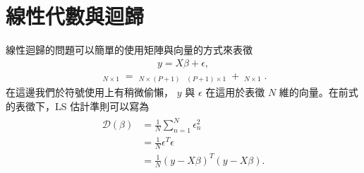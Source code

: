 \documentclass[letterpaper,10pt,english]{sphinxmanual}
\begin{document}
\section{線性代數與迴歸}
\label{\detokenize{notebook/linear-regression:id5}}
線性迴歸的問題可以簡單的使用矩陣與向量的方式來表徵
\begin{equation*}
\begin{split}y = X \beta + \epsilon,\end{split}
\end{equation*}\begin{equation*}
\begin{split}\mathop{\begin{pmatrix}
  y_{1} \\
  y_{2} \\
  \vdots \\
  y_{N}
 \end{pmatrix}}_{N \times 1}=
\mathop{\begin{pmatrix}
  1 & x_{11} & \cdots & x_{1P} \\
  1 & x_{21} & \cdots & x_{2P} \\
  \vdots  & \vdots  & \ddots & \vdots  \\
  1 & x_{N1} & \cdots & x_{NP}
 \end{pmatrix}}_{N \times (P+1)}
\mathop{\begin{pmatrix}
  \beta_{0} \\
  \beta_{1} \\
  \vdots \\
  \beta_{P}
 \end{pmatrix}}_{(P+1) \times 1}+
 \mathop{\begin{pmatrix}
  \epsilon_{1} \\
  \epsilon_{2} \\
  \vdots \\
  \epsilon_{N}
 \end{pmatrix}}_{N \times 1}.\end{split}
\end{equation*}
在這邊我們於符號使用上有稍微偷懶， \(y\) 與 \(\epsilon\) 在這用於表徵 \(N\) 維的向量。在前式的表徵下，LS 估計準則可以寫為
\begin{equation*}
\begin{split}\begin{aligned}
\mathcal{D}(\beta) & =  \frac{1}{N} \sum_{n=1}^N \epsilon_n^2 \\
  & = \frac{1}{N} \epsilon^T \epsilon\\
 & =  \frac{1}{N} (y-X\beta)^T(y-X\beta).
\end{aligned}\end{split}
\end{equation*}
\end{document}
